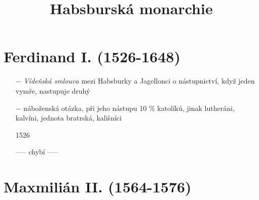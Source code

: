 \documentclass{article}
\title{\vspace{-2cm}Habsburská monarchie\vspace{-1.7cm}}
\date{}
\author{}
\begin{document}
\maketitle

\section*{Ferdinand I. (1526-1648)}
\begin{itemize}
    \vspace{-0.5em}
    \setlength\itemsep{0.15em}
    \item[$-$] \textit{Vídeňská smlouva} mezi Habsburky a Jagellonci o nástupnictví, když jeden vymře, nastupuje druhý
    \item[$-$] náboženská otázka, při jeho nástupu 10 \% katolíků, jinak lutheráni, kalvíni, jednota bratrská, kališníci
    \item[1526]
    \item[]  ----- chybí -----
\end{itemize}


\section*{Maxmilián II. (1564-1576)}
\end{document}
